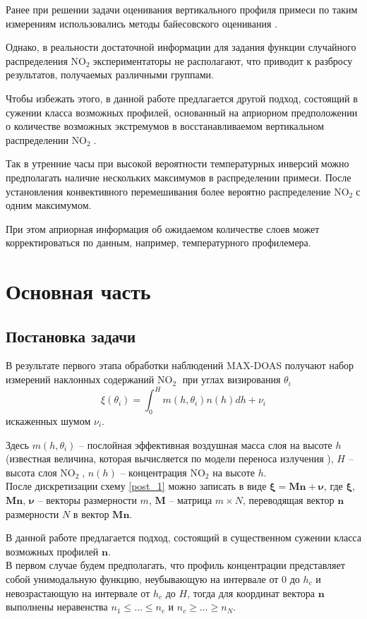 \documentclass[a4paper,14pt]{article}
\theoremstyle{plain}
\theoremstyle{definition}
\theoremstyle{remark}
\newcommand{\nl}{\\ \indent}
\newcommand{\no}{$\text{NO}_2 \;$}
\begin{document}
Ранее при решении задачи оценивания вертикального профиля примеси
по таким измерениям использовались методы байесовского оценивания
\cite{litlink1}. 

Однако, в реальности достаточной информации для задания функции
случайного распределения \no экспериментаторы не располагают, 
что приводит к разбросу результатов, получаемых различными
группами.
 
Чтобы избежать этого, в данной работе предлагается другой подход,
состоящий в сужении класса возможных профилей, основанный на
априорном предположении о количестве возможных экстремумов в
восстанавливаемом вертикальном распределении \no.
 
Так в утренние часы при высокой вероятности температурных
инверсий можно предполагать наличие нескольких максимумов в
распределении примеси. 
После установления конвективного перемешивания более вероятно
распределение \no  с одним максимумом. 

При этом априорная информация об ожидаемом количестве слоев 
может корректироваться по данным, например, температурного
профилемера.

 
\section{Основная часть}
\subsection{Постановка задачи}

В результате первого этапа обработки наблюдений MAX-DOAS 
получают набор измерений наклонных содержаний \no 
при углах визирования $\theta_i$
\begin{equation}
\xi(\theta_i) = 
\int_0^H
m(h, \theta_i) n(h) dh + \nu_i
\label{post_1}
\end{equation}
искаженных шумом $\nu_i$.
 
Здесь $m(h, \theta_i)$ -- послойная эффективная воздушная 
масса слоя на высоте $h$ (известная величина, которая 
вычисляется по модели переноса излучения \cite{litlink2}), 
$H$ -- высота слоя \no, $n(h)$ -- концентрация $\text{NO}_2$ 
на высоте $h$.
\nl
После дискретизации схему \eqref{post_1} можно записать в виде 
$\pmb\xi = \textbf{Mn} + \pmb\nu$, где 
$\pmb\xi$, $\textbf{Mn}$, $\pmb \nu$ -- векторы размерности 
$m$, $\textbf{M}$ -- матрица $m \times N$, переводящая вектор 
$\textbf{n}$ размерности $N$ в вектор $\textbf{Mn}$.
 
В данной работе предлагается подход, состоящий в существенном
сужении класса возможных профилей {$\textbf{n}$}.
\nl 
В первом случае будем предполагать, что профиль концентрации
представляет собой унимодальную функцию, неубывающую на 
интервале от $0$ до $h_c$ и невозрастающую на интервале от 
$h_c$ до $H$, тогда для координат вектора $\textbf{n}$ 
выполнены неравенства $n_1 \leq \ldots \leq n_c$ и 
$n_c \geq \ldots \geq n_N$.
\end{document}
